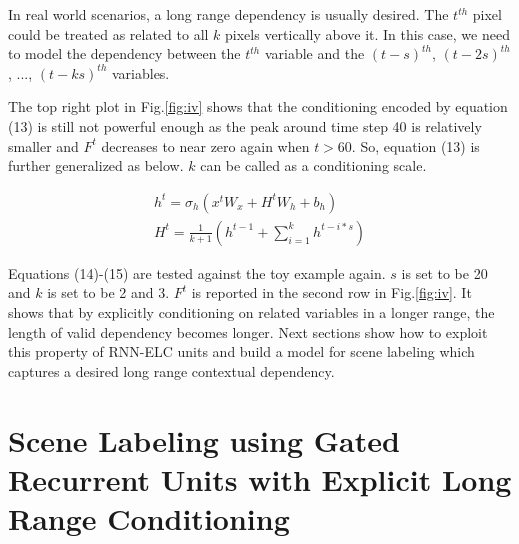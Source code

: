 \documentclass[10pt,twocolumn,letterpaper]{article}
\begin{document}
In real world scenarios, a long range dependency is usually desired. The $t^{th}$ pixel could be treated as related to all $k$ pixels vertically above it. In this case, we need to model the dependency between the $t^{th}$ variable and the $(t-s)^{th}$, $(t-2s)^{th}$, ..., $(t-ks)^{th}$ variables.

The top right plot in Fig.\ref{fig:iv} shows that the conditioning encoded by equation (13) is still not powerful enough as the peak around time step 40 is relatively smaller and $F^t$ decreases to near zero again when $t>60$. So, equation (13) is further generalized as below. $k$ can be called as a conditioning scale.

\begin{gather}
  h^{t} = \sigma_{h}({x^{t}W_x +  H^tW_h+b_h} ) \\
H^t  =   \frac{1}{k+1}  (h^{t-1} + \sum_{i=1}^{k} h^{t-i*s}) 
\end{gather}

Equations (14)-(15) are tested against the toy example again. $s$ is set to be 20 and $k$ is set to be 2 and 3. $F^t$ is reported in the second row in Fig.\ref{fig:iv}. It shows that by explicitly conditioning on related variables in a longer range, the length of valid dependency becomes longer. Next sections show how to exploit this property of RNN-ELC units and build a model for scene labeling which captures a desired long range contextual dependency.


\section{Scene Labeling using Gated Recurrent Units with Explicit Long Range Conditioning}
\end{document}
